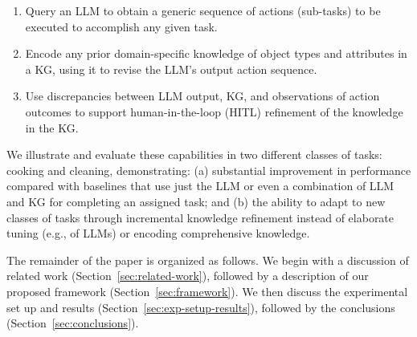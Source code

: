 \begin{enumerate}
    \vspace{-1em}
    \item Query an LLM to obtain a generic sequence of actions (sub-tasks) to be executed to accomplish any given task.
    \item Encode any prior domain-specific knowledge of object types and attributes in a KG, using it to revise the LLM's output action sequence.
   
    \item Use discrepancies between LLM output, KG, and observations of action outcomes to support human-in-the-loop (HITL) refinement of the knowledge in the KG.
    \vspace{-1.5em}
\end{enumerate}
We illustrate and evaluate these capabilities in two different classes of tasks: cooking and cleaning, demonstrating: (a) substantial improvement in performance compared with baselines that use just the LLM or even a combination of LLM and KG for completing an assigned task; and (b) the ability to adapt to new classes of tasks through incremental knowledge refinement instead of elaborate tuning (e.g., of LLMs) or encoding comprehensive knowledge.

\vspace{-0.75em}
The remainder of the paper is organized as follows. We begin with a discussion of related work (Section~\ref{sec:related-work}), followed by a description of our proposed framework (Section~\ref{sec:framework}). We then discuss the experimental set up and results (Section~\ref{sec:exp-setup-results}), followed by the conclusions (Section~\ref{sec:conclusions}).


